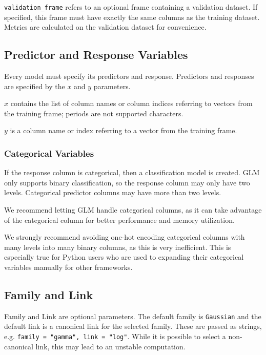 \texttt{validation\_frame} refers to an optional frame containing a validation dataset.  If specified, this 
frame must have exactly the same columns as the training dataset.  Metrics are calculated on the validation dataset for convenience.


\subsection{Predictor and Response Variables}

Every model must specify its predictors and response.  Predictors and responses are specified by the $x$
and $y$ parameters.

$x$ contains the list of column names or column indices referring to vectors from the training frame; periods are not supported characters.

$y$ is a column name or index referring to a vector from the training frame.

\subsubsection{Categorical Variables}

If the response column is categorical, then a classification model is created.  GLM only supports binary
classification, so the response column may only have two levels. Categorical predictor columns may have more than two levels.

We recommend letting GLM handle categorical columns, as it can take advantage of the categorical
column for better performance and memory utilization.

We strongly recommend avoiding one-hot encoding categorical columns with many levels into many binary columns, as this is very inefficient.  This is especially true for Python users who are used to expanding their categorical variables manually for other frameworks.

\subsection{Family and Link}

Family and Link are optional parameters. The default family is \texttt{Gaussian} and the default link is a
canonical link for the selected family. These are passed as strings, e.g. \texttt{family = "gamma", link = "log"}.
While it is possible to select  a non-canonical link, this may lead to an unstable computation. 

